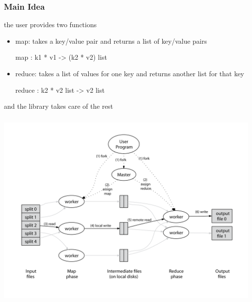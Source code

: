 \documentclass{beamer}
\let\emph\alert
\begin{document}
\begin{frame}\frametitle{Main Idea}
  the user provides two functions
  \begin{itemize}
  \item \emph{map}: takes a key/value pair and returns a list of key/value
    pairs
    \begin{ocaml}
    map : k1 * v1 -> (k2 * v2) list
    \end{ocaml}



  \item \emph{reduce}: takes a list of values for one key and returns
    another list for that key
    \begin{ocaml}
    reduce : k2 * v2 list -> v2 list
    \end{ocaml}
  \end{itemize}



  and the library takes care of the rest
\end{frame}


\begin{frame}\frametitle{}
  \begin{center}
    \includegraphics[width=\textwidth]{mrfigure}
  \end{center}
\end{frame}
\end{document}
